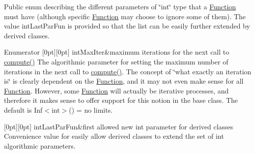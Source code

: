 Public enum describing the different parameters of \char`\"{}int\char`\"{} type that a \mbox{\hyperlink{class_s_m_spp__di__unipi__it_1_1_function}{Function}} must have (although specific \mbox{\hyperlink{class_s_m_spp__di__unipi__it_1_1_function}{Function}} may choose to ignore some of them). The value int\+Last\+Par\+Fun is provided so that the list can be easily further extended by derived classes. \begin{DoxyEnumFields}{Enumerator}
[0pt][0pt]{}\mbox{\label{class_s_m_spp__di__unipi__it_1_1_function_a6e928ff7188d46bdb66f31cda302ab06a18fd973f71832c25b32393317e4d6eca}} 
int\+Max\+Iter&maximum iterations for the next call to \mbox{\hyperlink{class_s_m_spp__di__unipi__it_1_1_function_a504d4e3e174c7a518cc66156a8a45ce5}{compute()}} The algorithmic parameter for setting the maximum number of iterations in the next call to \mbox{\hyperlink{class_s_m_spp__di__unipi__it_1_1_function_a504d4e3e174c7a518cc66156a8a45ce5}{compute()}}. The concept of \char`\"{}what exactly an iteration is\char`\"{} is clearly dependent on the \mbox{\hyperlink{class_s_m_spp__di__unipi__it_1_1_function}{Function}}, and it may not even make sense for all \mbox{\hyperlink{class_s_m_spp__di__unipi__it_1_1_function}{Function}}. However, some \mbox{\hyperlink{class_s_m_spp__di__unipi__it_1_1_function}{Function}} will actually be iterative processes, and therefore it makes sense to offer support for this notion in the base class. The default is Inf$<$int$>$() = no limits. \\
\hline

[0pt][0pt]{}\mbox{\label{class_s_m_spp__di__unipi__it_1_1_function_a6e928ff7188d46bdb66f31cda302ab06abcd12185e11be88c7ccaaf635c0304f3}} 
int\+Last\+Par\+Fun&first allowed new int parameter for derived classes Convenience value for easily allow derived classes to extend the set of int algorithmic parameters. \\
\hline

\end{DoxyEnumFields}


